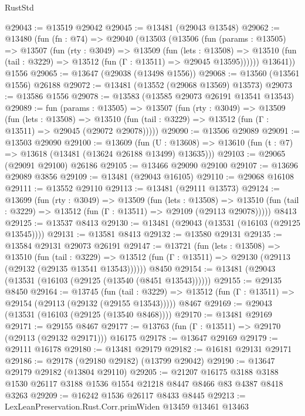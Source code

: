 \begin{lexlean}{RustStd}
\begin{coremodule}
@29043 := @13519 @29042
@29045 := @13481 (@29043 @13548)
@29062 := @13480
    (fun (fn : @74) =>
    @29040
      (@13503
        (@13506
          (fun (params : @13505) =>
          @13507
            (fun (rty : @3049) =>
            @13509
              (fun (lets : @13508) =>
              @13510 (fun (tail : @3229) => @13512 (fun (Γ : @13511) => @29045 @13595))))))
        @13641))
    @1556
@29065 := @13647 (@29038 (@13498 @1556))
@29068 := @13560 (@13561 @1556) @26188
@29072 := @13481 (@13552 (@29068 @13569) @13573)
@29073 := @13586 @1556
@29078 := @13583 (@13585 @29073 @26191 @13541 @13543)
@29089 := fun (params : @13505) =>
  @13507
    (fun (rty : @3049) =>
    @13509
      (fun (lets : @13508) =>
      @13510 (fun (tail : @3229) => @13512 (fun (Γ : @13511) => @29045 (@29072 @29078)))))
@29090 := @13506 @29089
@29091 := @13503 @29090
@29100 := @13609
    (fun (U : @13608) => @13610 (fun (t : @7) => @13618 (@13481 (@13624 @26188 @13499) @13635)))
@29103 := @29065 (@29091 @29100) @26186
@29105 := @13466 @29090 @29100
@29107 := @13696 @29089 @3856
@29109 := @13481 (@29043 @16105)
@29110 := @29068 @16108
@29111 := @13552 @29110
@29113 := @13481 (@29111 @13573)
@29124 := @13699
    (fun (rty : @3049) =>
    @13509
      (fun (lets : @13508) =>
      @13510 (fun (tail : @3229) => @13512 (fun (Γ : @13511) => @29109 (@29113 @29078)))))
    @8413
@29125 := @13537 @8413
@29130 := @13481 (@29043 (@13531 (@16103 (@29125 @13545))))
@29131 := @13581 @8413
@29132 := @13580 @29131
@29135 := @13584 @29131 @29073 @26191
@29147 := @13721
    (fun (lets : @13508) =>
    @13510
      (fun (tail : @3229) =>
      @13512 (fun (Γ : @13511) => @29130 (@29113 (@29132 (@29135 @13541 @13543))))))
    @8450
@29154 := @13481 (@29043 (@13531 (@16103 (@29125 (@13540 (@8451 @13543))))))
@29155 := @29135 @8450
@29164 := @13745
    (fun (tail : @3229) => @13512 (fun (Γ : @13511) => @29154 (@29113 (@29132 (@29155 @13543)))))
    @8467
@29169 := @29043 (@13531 (@16103 (@29125 (@13540 @8468))))
@29170 := @13481 @29169
@29171 := @29155 @8467
@29177 := @13763 (fun (Γ : @13511) => @29170 (@29113 (@29132 @29171))) @16175
@29178 := @13647 @29169
@29179 := @29111 @16178
@29180 := @13481 @29179
@29182 := @16181 @29131 @29171
@29186 := @29178 (@29180 @29182) (@13799 @29042)
@29190 := @13647 @29179 @29182 (@13804 @29110)
@29205 := @21207
    @16175
    @3188
    @3188
    @1530
    @26117
    @3188
    @1536
    @1554
    @21218
    @8447
    @8466
    @83
    @4387
    @8418
    @3263
@29209 := @16242 @1536 @26117 @8433 @8445
@29213 := LexLeanPreservation.Rust.Corr.primWiden @13459 @13461 @13463

\end{coremodule}
\end{lexlean}
